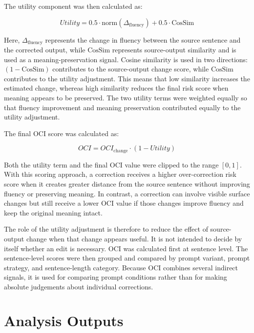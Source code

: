 The utility component was then calculated as:

\begin{equation}
Utility = 0.5 \cdot \text{norm}(\Delta_{\text{fluency}}) + 0.5 \cdot \text{CosSim}
\end{equation}

Here, $\Delta_{\text{fluency}}$ represents the change in fluency between the source sentence and the corrected output, while $\text{CosSim}$ represents source-output similarity and is used as a meaning-preservation signal. Cosine similarity is used in two directions: $(1-\text{CosSim})$ contributes to the source-output change score, while $\text{CosSim}$ contributes to the utility adjustment. This means that low similarity increases the estimated change, whereas high similarity reduces the final risk score when meaning appears to be preserved. The two utility terms were weighted equally so that fluency improvement and meaning preservation contributed equally to the utility adjustment.

The final OCI score was calculated as:

\begin{equation}
OCI = OCI_{\text{change}} \cdot (1 - Utility)
\end{equation}

Both the utility term and the final OCI value were clipped to the range $[0,1]$. With this scoring approach, a correction receives a higher over-correction risk score when it creates greater distance from the source sentence without improving fluency or preserving meaning. In contrast, a correction can involve visible surface changes but still receive a lower OCI value if those changes improve fluency and keep the original meaning intact.

The role of the utility adjustment is therefore to reduce the effect of source-output change when that change appears useful. It is not intended to decide by itself whether an edit is necessary. OCI was calculated first at sentence level. The sentence-level scores were then grouped and compared by prompt variant, prompt strategy, and sentence-length category. Because OCI combines several indirect signals, it is used for comparing prompt conditions rather than for making absolute judgements about individual corrections.

\section{Analysis Outputs}

